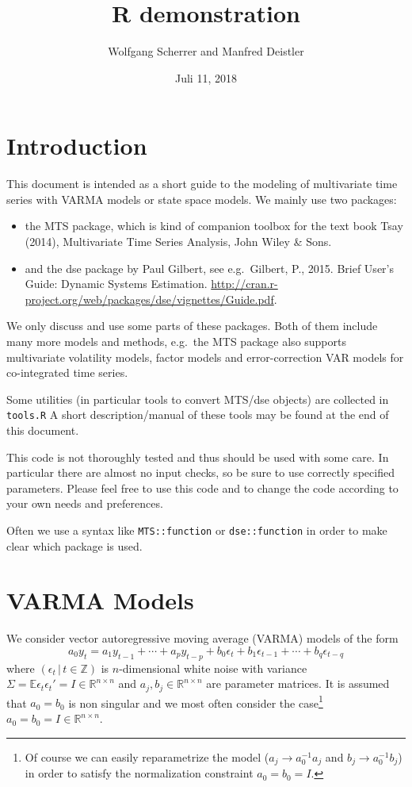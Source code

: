 \documentclass[]{article}
\title{R demonstration}
\author{Wolfgang Scherrer and Manfred Deistler}
\date{Juli 11, 2018}
\providecommand{\tightlist}{%
  \setlength{\itemsep}{0pt}\setlength{\parskip}{0pt}}
\let\rmarkdownfootnote\footnote%
\def\footnote{\protect\rmarkdownfootnote}
\begin{document}
\maketitle

{
\setcounter{tocdepth}{2}
\tableofcontents
}
\section{Introduction}\label{introduction}

This document is intended as a short guide to the modeling of
multivariate time series with VARMA models or state space models. We
mainly use two packages:

\begin{itemize}
\tightlist
\item
  the MTS package, which is kind of companion toolbox for the text book
  Tsay (2014), Multivariate Time Series Analysis, John Wiley \& Sons.
\item
  and the dse package by Paul Gilbert, see e.g.~Gilbert, P., 2015. Brief
  User's Guide: Dynamic Systems Estimation.
  \url{http://cran.r-project.org/web/packages/dse/vignettes/Guide.pdf}.
\end{itemize}

We only discuss and use some parts of these packages. Both of them
include many more models and methods, e.g.~the MTS package also supports
multivariate volatility models, factor models and error-correction VAR
models for co-integrated time series.

Some utilities (in particular tools to convert MTS/dse objects) are
collected in \texttt{tools.R} A short description/manual of these tools
may be found at the end of this document.

This code is not thoroughly tested and thus should be used with some
care. In particular there are almost no input checks, so be sure to use
correctly specified parameters. Please feel free to use this code and to
change the code according to your own needs and preferences.

Often we use a syntax like \texttt{MTS::function} or
\texttt{dse::function} in order to make clear which package is used.

\section{VARMA Models}\label{varma-models}

We consider vector autoregressive moving average (VARMA) models of the
form \[
a_0 y_t = a_1 y_{t-1} + \cdots + a_p y_{t-p} + 
          b_0 \epsilon_t + b_1 \epsilon_{t-1} + \cdots + b_q \epsilon_{t-q}
\] where \((\epsilon_t\,|\,t\in\mathbb{Z})\) is \(n\)-dimensional white
noise with variance
\(\Sigma=\mathbb{E}\epsilon_t\epsilon_t'=I\in\mathbb{R}^{n\times n}\)
and \(a_j, b_j\in\mathbb{R}^{n\times n}\) are parameter matrices. It is
assumed that \(a_0=b_0\) is non singular and we most often consider the
case\footnote{Of course we can easily reparametrize the model
  (\(a_j\rightarrow a_0^{-1}a_j\) and \(b_j\rightarrow a_0^{-1}b_j\)) in
  order to satisfy the normalization constraint \(a_0=b_0=I\).}
\(a_0=b_0=I\in \mathbb{R}^{n\times n}\).
\end{document}
